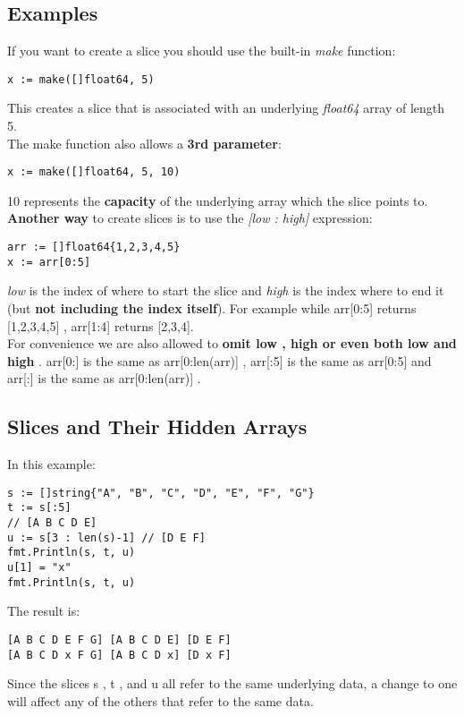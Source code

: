 \documentclass[10pt,letterpaper]{report}
\begin{document}
\subsection{Examples}
If you want to create a slice you should use the built-in \textit{make} function:
\begin{lstlisting}
x := make([]float64, 5)
\end{lstlisting}
This creates a slice that is associated with an underlying \textit{float64} array of length 5.\\
The make function also allows a \textbf{3rd parameter}:
\begin{lstlisting}
x := make([]float64, 5, 10)
\end{lstlisting}
10 represents the \textbf{capacity} of the underlying array which the slice points to.\\
\textbf{Another way} to create slices is to use the \textit{[low : high]} expression:
\begin{lstlisting}
arr := []float64{1,2,3,4,5}
x := arr[0:5]
\end{lstlisting}
\textit{low} is the index of where to start the slice and \textit{high} is the index where to end it (but \textbf{not including the index itself}). For example while arr[0:5] returns [1,2,3,4,5] , arr[1:4] returns [2,3,4].\\
For convenience we are also allowed to \textbf{omit low , high or even both low and high} . arr[0:] is the same as arr[0:len(arr)] , arr[:5] is the same as arr[0:5] and arr[:] is the same as arr[0:len(arr)] .\\
\subsection{Slices and Their Hidden Arrays}
In this example:
\begin{lstlisting}
s := []string{"A", "B", "C", "D", "E", "F", "G"}
t := s[:5]
// [A B C D E]
u := s[3 : len(s)-1] // [D E F]
fmt.Println(s, t, u)
u[1] = "x"
fmt.Println(s, t, u)
\end{lstlisting}
The result is:
\begin{lstlisting}
[A B C D E F G] [A B C D E] [D E F]
[A B C D x F G] [A B C D x] [D x F]
\end{lstlisting}
Since the slices s , t , and u all refer to the same underlying data, a change to one will affect any of the others that refer to the same data. 
\end{document}
